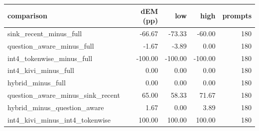 \begin{tabular}{lrrrr}
\toprule
comparison & dEM (pp) & low & high & prompts \\
\midrule
sink\_recent\_minus\_full & -66.67 & -73.33 & -60.00 & 180 \\
question\_aware\_minus\_full & -1.67 & -3.89 & 0.00 & 180 \\
int4\_tokenwise\_minus\_full & -100.00 & -100.00 & -100.00 & 180 \\
int4\_kivi\_minus\_full & 0.00 & 0.00 & 0.00 & 180 \\
hybrid\_minus\_full & 0.00 & 0.00 & 0.00 & 180 \\
question\_aware\_minus\_sink\_recent & 65.00 & 58.33 & 71.67 & 180 \\
hybrid\_minus\_question\_aware & 1.67 & 0.00 & 3.89 & 180 \\
int4\_kivi\_minus\_int4\_tokenwise & 100.00 & 100.00 & 100.00 & 180 \\
\bottomrule
\end{tabular}
